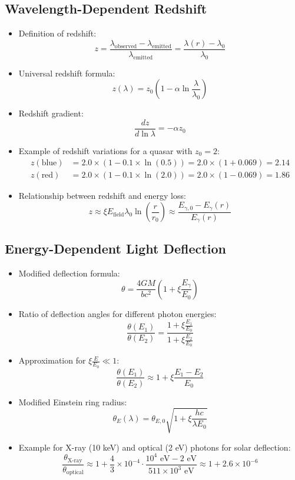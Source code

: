 \documentclass[12pt,a4paper]{article}
\begin{document}
	\subsection{Wavelength-Dependent Redshift}
\begin{itemize}
	\item Definition of redshift:
	$$z = \frac{\lambda_{\text{observed}} - \lambda_{\text{emitted}}}{\lambda_{\text{emitted}}} = \frac{\lambda(r) - \lambda_0}{\lambda_0}$$
	
	\item Universal redshift formula:
	$$\boxed{z(\lambda) = z_0\left(1 - \alpha \ln\frac{\lambda}{\lambda_0}\right)}$$
	
	\item Redshift gradient:
	$$\frac{dz}{d\ln\lambda} = -\alpha z_0$$
	
	\item Example of redshift variations for a quasar with $z_0 = 2$:
	\begin{align*}
		z(\text{blue}) &= 2.0 \times (1 - 0.1 \times \ln(0.5)) = 2.0 \times (1 + 0.069) = 2.14\\
		z(\text{red}) &= 2.0 \times (1 - 0.1 \times \ln(2.0)) = 2.0 \times (1 - 0.069) = 1.86
	\end{align*}
	
	\item Relationship between redshift and energy loss:
	$$z \approx \xi E_{\text{field}} \lambda_0 \ln\left(\frac{r}{r_0}\right) \approx \frac{E_{\gamma,0} - E_\gamma(r)}{E_\gamma(r)}$$
\end{itemize}

	\subsection{Energy-Dependent Light Deflection}
	\begin{itemize}
		\item Modified deflection formula:
		$$\boxed{\theta = \frac{4GM}{bc^2}\left(1 + \xi \frac{E_\gamma}{E_0}\right)}$$
		
		\item Ratio of deflection angles for different photon energies:
		$$\frac{\theta(E_1)}{\theta(E_2)} = \frac{1 + \xi \frac{E_1}{E_0}}{1 + \xi \frac{E_2}{E_0}}$$
		
		\item Approximation for $\xi \frac{E}{E_0} \ll 1$:
		$$\frac{\theta(E_1)}{\theta(E_2)} \approx 1 + \xi \frac{E_1 - E_2}{E_0}$$
		
		\item Modified Einstein ring radius:
		$$\theta_E(\lambda) = \theta_{E,0} \sqrt{1 + \xi \frac{hc}{\lambda E_0}}$$
		
		\item Example for X-ray (10 keV) and optical (2 eV) photons for solar deflection:
		$$\frac{\theta_{\text{X-ray}}}{\theta_{\text{optical}}} \approx 1 + \frac{4}{3} \times 10^{-4} \cdot \frac{10^4 \text{ eV} - 2 \text{ eV}}{511 \times 10^3 \text{ eV}} \approx 1 + 2.6 \times 10^{-6}$$
	\end{itemize}
	
\end{document}
